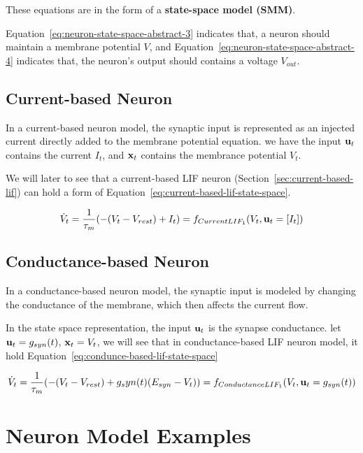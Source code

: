 These equations are in the form of a \textbf{state-space model (SMM)}.


Equation~\ref{eq:neuron-state-space-abstract-3} indicates that, a neuron should maintain a membrane potential $V$, 
and Equation~\ref{eq:neuron-state-space-abstract-4} indicates that, the neuron's output should contains a 
voltage $V_{out}$.

\subsection{Current-based Neuron}
In a current-based neuron model, the synaptic input is represented as an injected current directly 
added to the membrane potential equation.
we have the input $\bold u_t$ contains the current $I_t$, and $\bold x_t$ contains the membrance potential $V_t$.

We will later to see that a current-based LIF neuron (Section~\ref{sec:current-based-lif}) can hold a form of 
Equation~\ref{eq:current-based-lif-state-space}.


\begin{equation}\label{eq:current-based-lif-state-space}
    \dot V_t = \frac{1}{\tau_m}(-(V_t-V_{rest})+I_t) = f_{CurrentLIF_1}(V_t, \bold u_t = [I_t])
\end{equation}



\subsection{Conductance-based Neuron}
In a conductance-based neuron model, the synaptic input is modeled by changing the conductance of the membrane, 
which then affects the current flow.

In the state space representation, the input $\bold u_t$ is the synapse conductance.
let $\bold u_t=g_{syn}(t)$, $\bold x_t = V_t$, we will see that in conductance-based LIF neuron model, it 
hold Equation~\ref{eq:condunce-based-lif-state-space}

\begin{equation}\label{eq:condunce-based-lif-state-space}
    \dot V_t = \frac{1}{\tau_m}(-(V_t-V_{rest})+g_syn(t)(E_{syn}-V_t)) = f_{ConductanceLIF_1}(V_t,  \bold u_t = g_{syn}(t))
\end{equation}




\section{Neuron Model Examples}
